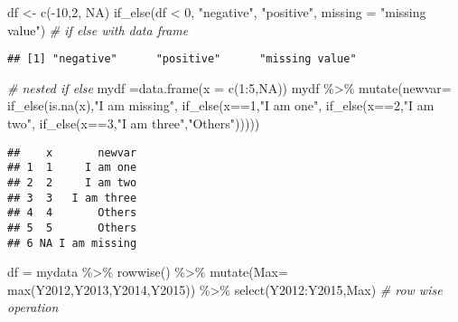 \documentclass[
]{article}
\newenvironment{Shaded}{\begin{snugshade}}{\end{snugshade}}
\newcommand{\AttributeTok}[1]{\textcolor[rgb]{0.77,0.63,0.00}{#1}}
\newcommand{\CommentTok}[1]{\textcolor[rgb]{0.56,0.35,0.01}{\textit{#1}}}
\newcommand{\ConstantTok}[1]{\textcolor[rgb]{0.00,0.00,0.00}{#1}}
\newcommand{\DecValTok}[1]{\textcolor[rgb]{0.00,0.00,0.81}{#1}}
\newcommand{\FunctionTok}[1]{\textcolor[rgb]{0.00,0.00,0.00}{#1}}
\newcommand{\NormalTok}[1]{#1}
\newcommand{\OtherTok}[1]{\textcolor[rgb]{0.56,0.35,0.01}{#1}}
\newcommand{\SpecialCharTok}[1]{\textcolor[rgb]{0.00,0.00,0.00}{#1}}
\newcommand{\StringTok}[1]{\textcolor[rgb]{0.31,0.60,0.02}{#1}}
\begin{document}
\begin{Shaded}
\begin{Highlighting}[]
\NormalTok{df }\OtherTok{\textless{}{-}} \FunctionTok{c}\NormalTok{(}\SpecialCharTok{{-}}\DecValTok{10}\NormalTok{,}\DecValTok{2}\NormalTok{, }\ConstantTok{NA}\NormalTok{)}
\FunctionTok{if\_else}\NormalTok{(df }\SpecialCharTok{\textless{}} \DecValTok{0}\NormalTok{, }\StringTok{"negative"}\NormalTok{, }\StringTok{"positive"}\NormalTok{, }\AttributeTok{missing =} \StringTok{"missing value"}\NormalTok{) }\CommentTok{\# if else with data frame}
\end{Highlighting}
\end{Shaded}

\begin{verbatim}
## [1] "negative"      "positive"      "missing value"
\end{verbatim}

\begin{Shaded}
\begin{Highlighting}[]
\CommentTok{\# nested if else}
\NormalTok{mydf }\OtherTok{=}\FunctionTok{data.frame}\NormalTok{(}\AttributeTok{x =} \FunctionTok{c}\NormalTok{(}\DecValTok{1}\SpecialCharTok{:}\DecValTok{5}\NormalTok{,}\ConstantTok{NA}\NormalTok{))}
\NormalTok{mydf }\SpecialCharTok{\%\textgreater{}\%} \FunctionTok{mutate}\NormalTok{(}\AttributeTok{newvar=} \FunctionTok{if\_else}\NormalTok{(}\FunctionTok{is.na}\NormalTok{(x),}\StringTok{"I am missing"}\NormalTok{,}
\FunctionTok{if\_else}\NormalTok{(x}\SpecialCharTok{==}\DecValTok{1}\NormalTok{,}\StringTok{"I am one"}\NormalTok{,}
\FunctionTok{if\_else}\NormalTok{(x}\SpecialCharTok{==}\DecValTok{2}\NormalTok{,}\StringTok{"I am two"}\NormalTok{,}
\FunctionTok{if\_else}\NormalTok{(x}\SpecialCharTok{==}\DecValTok{3}\NormalTok{,}\StringTok{"I am three"}\NormalTok{,}\StringTok{"Others"}\NormalTok{)))))}
\end{Highlighting}
\end{Shaded}

\begin{verbatim}
##    x       newvar
## 1  1     I am one
## 2  2     I am two
## 3  3   I am three
## 4  4       Others
## 5  5       Others
## 6 NA I am missing
\end{verbatim}

\begin{Shaded}
\begin{Highlighting}[]
\NormalTok{df }\OtherTok{=}\NormalTok{ mydata }\SpecialCharTok{\%\textgreater{}\%} \FunctionTok{rowwise}\NormalTok{() }\SpecialCharTok{\%\textgreater{}\%} \FunctionTok{mutate}\NormalTok{(}\AttributeTok{Max=} \FunctionTok{max}\NormalTok{(Y2012,Y2013,Y2014,Y2015)) }\SpecialCharTok{\%\textgreater{}\%} \FunctionTok{select}\NormalTok{(Y2012}\SpecialCharTok{:}\NormalTok{Y2015,Max) }\CommentTok{\# row wise operation}
\end{Highlighting}
\end{Shaded}
\end{document}
